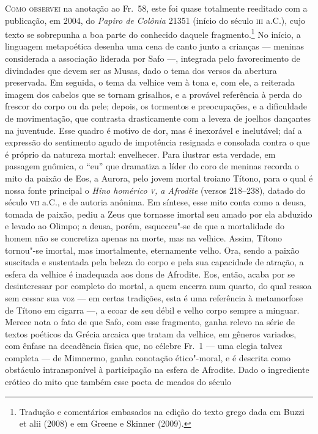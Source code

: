 \textsc{Como observei} na anotação ao Fr.~58, este foi quase totalmente reeditado com a 
publicação, em 2004, do \textit{Papiro de Colônia} 21351 (início do século \textsc{iii} a.C.), 
cujo texto se sobrepunha a boa parte do conhecido daquele fragmento.\footnote{Tradução e comentários embasados na edição do texto grego dada em Buzzi et alii (2008) e em Greene e Skinner (2009).} No início, a 
linguagem metapoética desenha uma cena de canto junto a crianças --- meninas
considerada a associação liderada por Safo ---, 
integrada pelo favorecimento de divindades que devem ser as Musas,
dado o tema dos versos da abertura preservada. Em seguida, o tema da velhice
vem à tona e, com ele, a reiterada imagem dos cabelos que se tornam grisalhos,
e a provável referência à perda do frescor do corpo ou da pele; depois, os
tormentos e preocupações, e a dificuldade de movimentação, que contrasta
drasticamente com a leveza de joelhos dançantes na juventude. Esse quadro é
motivo de dor, mas é inexorável e inelutável; daí a expressão do sentimento
agudo de impotência resignada e consolada contra o que é próprio da natureza mortal: envelhecer. Para
ilustrar esta verdade, em passagem gnômica, o “eu” que dramatiza a líder do coro de meninas recorda o
mito da paixão de Eos, a Aurora, pelo jovem mortal troiano Títono, para o qual é nossa fonte
principal o \textit{Hino homérico \textsc{v}, a Afrodite }(versos 218--238), datado do
século \textsc{vii} a.C., e de autoria anônima. Em síntese, esse mito conta como a
deusa, tomada de paixão, pediu a Zeus que tornasse imortal seu amado por ela abduzido e levado ao Olimpo; a deusa,
porém, esqueceu"-se de que a mortalidade do homem não se concretiza apenas na
morte, mas na velhice. Assim, Títono tornou"-se imortal, mas imortalmente,
eternamente velho. Ora, sendo a paixão suscitada e sustentada pela
beleza do corpo e pela sua capacidade de atração, a esfera da velhice é
inadequada aos dons de Afrodite. Eos, então, acaba por se desinteressar por
completo do mortal, a quem encerra num quarto, do qual ressoa sem cessar sua
voz --- em certas tradições, esta é uma referência à metamorfose de Títono em
cigarra ---, a ecoar de seu débil e velho corpo sempre a minguar. Merece nota o fato de
que Safo, com esse fragmento, ganha relevo na série de textos poéticos da
Grécia arcaica que tratam da velhice, em gêneros variados, com ênfase na
decadência física que, no célebre Fr.~1 --- uma elegia talvez completa --- de
Mimnermo, ganha conotação ético"-moral, e é descrita como obstáculo
intransponível à participação na esfera de Afrodite.
Dado o ingrediente erótico do mito que também esse poeta de meados do século

